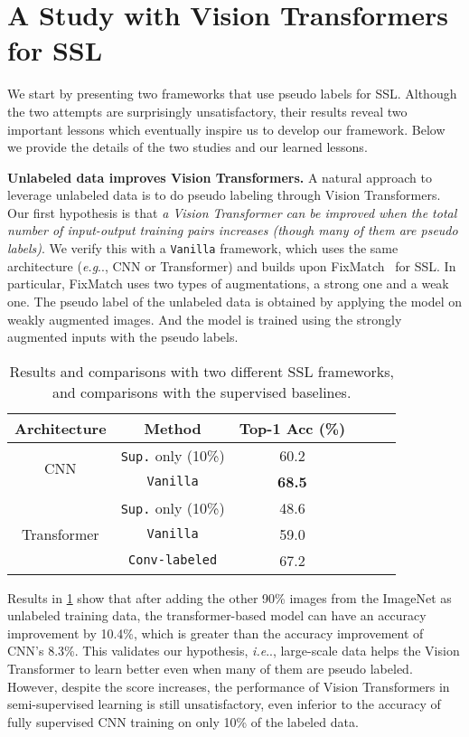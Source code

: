 \documentclass[runningheads]{llncs}
\makeatletter
\DeclareRobustCommand\onedot{\futurelet\@let@token\@onedot}
\def\@onedot{\ifx\@let@token.\else.\null\fi\xspace}
\def\eg{\emph{e.g}\onedot} \def\Eg{\emph{E.g}\onedot}
\def\ie{\emph{i.e}\onedot} \def\Ie{\emph{I.e}\onedot}
\newcommand{\fakeparagraph}[1]{\textbf{#1}}
\newcommand*{\vanilla}{\texttt{Vanilla}\@\xspace}
\newcommand*{\convl}{\texttt{Conv-labeled}\@\xspace}
\newcommand*{\supervised}{\texttt{Sup.}\@\xspace}
\makeatother
\begin{document}
\section{A Study with Vision Transformers for SSL} \label{sec:study}
We start by presenting two frameworks that use pseudo labels for SSL. Although the two attempts are surprisingly unsatisfactory, their results reveal two important lessons which eventually inspire us to develop our framework. Below we provide the details of the two studies and our learned lessons. 

\fakeparagraph{Unlabeled data improves Vision Transformers.} A natural approach to leverage unlabeled data is to do pseudo labeling through Vision Transformers. Our first hypothesis is that \emph{a Vision Transformer can be improved when the total number of input-output training pairs increases (though many of them are pseudo labels)}. We verify this with a {\vanilla} framework, which uses the same architecture (\eg, CNN or Transformer) and builds upon FixMatch~\cite{sohn2020fixmatch} for SSL. In particular, FixMatch uses two types of augmentations, a strong one and a weak one. The pseudo label of the unlabeled data is obtained by applying the model on weakly augmented images. And the model is trained using the strongly augmented inputs with the pseudo labels. 

\begin{table}[h]
\renewcommand\arraystretch{1.1}
\centering\small
\caption{Results and comparisons with two different SSL frameworks, and comparisons with the supervised baselines.}
\setlength{\tabcolsep}{10pt}
\begin{tabular}{cc cccc}
\toprule
\textbf{Architecture} & \textbf{Method} & \textbf{Top-1 Acc (\%)} \\
\midrule
\multirow{2}{*}{CNN} & \supervised only (10\%) & 60.2  \\
& \vanilla & \textbf{68.5}  \\
\midrule
\multirow{3}{*}{Transformer} & \supervised only (10\%) & 48.6 \\
& \vanilla & 59.0 \\
& \convl & 67.2 \\
\bottomrule
\end{tabular}
\label{table:preexp}
\end{table}
\setlength{\tabcolsep}{1.4pt}

Results in \cref{table:preexp} show that after adding the other 90\% images from the ImageNet as unlabeled training data, the transformer-based model can have an accuracy improvement by 10.4\%, which is greater than the accuracy improvement of CNN's 8.3\%. This validates our hypothesis, \ie, large-scale data helps the Vision Transformer to learn better even when many of them are pseudo labeled. However, despite the score increases, the performance of Vision Transformers in semi-supervised learning is still unsatisfactory, even inferior to the accuracy of fully supervised CNN training on only 10\% of the labeled data.
\end{document}
